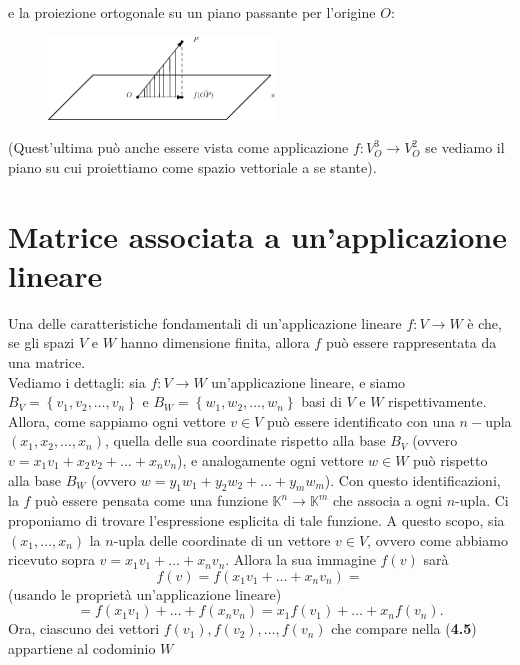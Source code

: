 \begin{definizione}
\begin{esempio}
    e la proiezione ortogonale su un piano passante per l'origine $O$:
    \begin{figure}[th]
      \centering
        \includegraphics[width=6cm]{img/finiti/imgex4-2-10.eps}
    \end{figure}
    (Quest'ultima può anche essere vista come applicazione $f:V_O^3\to V_O^2$ se vediamo il piano su cui
    proiettiamo come spazio vettoriale a se stante).
  \end{esempio}
\end{definizione}

\section{Matrice associata a un'applicazione lineare}
Una delle caratteristiche fondamentali di un'applicazione lineare $f:V\to W$ è che, se gli spazi $V$ e $W$ hanno
dimensione finita, allora $f$ può essere rappresentata da una matrice.\\ Vediamo i dettagli: sia $f:V\to W$
un'applicazione lineare, e siamo $B_V=\left\{v_1,v_2,\dots,v_n\right\}$ e $B_W=\left\{w_1,w_2,\dots,w_n\right\}$
basi di $V$ e $W$ rispettivamente. Allora, come sappiamo ogni vettore $v\in V$ può essere identificato con una
$n-$upla $\left(x_1,x_2,\dots,x_n\right)$, quella delle sua coordinate rispetto alla base $B_V$ (ovvero
$v=x_1v_1+x_2v_2+\dots+x_nv_n$), e analogamente ogni vettore $w\in W$ può rispetto alla base $B_W$ (ovvero
$w=y_1w_1+y_2w_2+\dots+y_mw_m$). Con questo identificazioni, la $f$ può essere pensata come una funzione
$\mathds{K}^n\to\mathds{K}^m$ che associa a ogni $n$-upla. Ci proponiamo di trovare l'espressione esplicita di
tale funzione. A questo scopo, sia $(x_1,\dots,x_n)$ la $n$-upla delle coordinate di un vettore $v\in V$, ovvero
come abbiamo ricevuto sopra $v=x_1v_1+\dots+x_nv_n$. Allora la sua immagine $f(v)$ sarà
\begin{equation*}
  f(v)=f(x_1v_1+\dots+x_nv_n) =
\end{equation*}
(usando le proprietà un'applicazione lineare)
\begin{equation}
  =f(x_1v_1)+\dots+f(x_nv_n)=x_1f(v_1)+\dots+x_nf(v_n).
\end{equation}
Ora, ciascuno dei vettori $f(v_1),f(v_2),\dots,f(v_n)$ che compare nella ({\bf 4.5}) appartiene al codominio $W$
